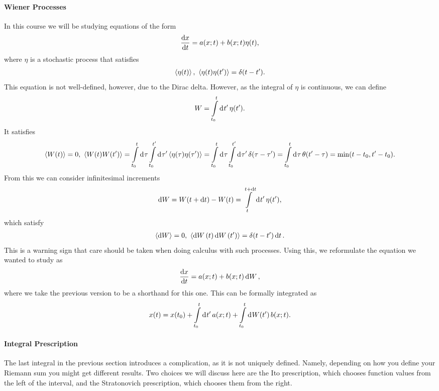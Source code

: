 \paragraph{Wiener Processes}
In this course we will be studying equations of the form
\begin{align*}
	\dv{x}{t} = a(x; t) + b(x; t)\eta(t),
\end{align*}
where $\eta$ is a stochastic process that satisfies
\begin{align*}
	\expval{\eta(t)},\ \expval{\eta(t)\eta(t\ensuremath{^{\prime}})} = \delta(t - t^{\prime}).
\end{align*}
This equation is not well-defined, however, due to the Dirac delta. However, as the integral of $\eta$ is continuous, we can define
\begin{align*}
	W = \int\limits_{t_{0}}^{t}\dd[]{t\ensuremath{^{\prime}}}\eta(t^{\prime}).
\end{align*}
It satisfies
\begin{align*}
	\expval{W(t)} = 0,\ \expval{W(t)W(t\ensuremath{^{\prime}})} = \int\limits_{t_{0}}^{t}\dd[]{\tau}\int\limits_{t_{0}}^{t^{\prime}}\dd[]{\tau\ensuremath{^{\prime}}}\expval{\eta(\tau)\eta(\tau\ensuremath{^{\prime}})} = \int\limits_{t_{0}}^{t}\dd[]{\tau}\int\limits_{t_{0}}^{t^{\prime}}\dd[]{\tau\ensuremath{^{\prime}}}\delta(\tau - \tau^{\prime}) = \int\limits_{t_{0}}^{t}\dd[]{\tau}\theta(t^{\prime} - \tau) = \min(t - t_{0}, t^{\prime} - t_{0}).
\end{align*}
From this we can consider infinitesimal increments
\begin{align*}
	\dd{W} = W(t + \dd{t}) - W(t) = \int\limits_{t}^{t + \dd{t}}\dd[]{t\ensuremath{^{\prime}}}\eta(t^{\prime}),
\end{align*}
which satisfy
\begin{align*}
	\expval{\dd{W}} = 0,\ \expval{\dd{W}(t)\dd{W}(t\ensuremath{^{\prime}})} = \delta(t - t^{\prime})\dd{t}.
\end{align*}
This is a warning sign that care should be taken when doing calculus with such processes. Using this, we reformulate the equation we wanted to study as
\begin{align*}
	\dv{x}{t} = a(x; t) + b(x; t)\dd{W},
\end{align*}
where we take the previous version to be a shorthand for this one. This can be formally integrated as
\begin{align*}
	x(t) = x(t_{0}) + \int\limits_{t_{0}}^{t}\dd[]{t\ensuremath{^{\prime}}}a(x; t) + \int\limits_{t_{0}}^{t}\dd[]{W(t\ensuremath{^{\prime}})}b(x; t).
\end{align*}

\paragraph{Integral Prescription}
The last integral in the previous section introduces a complication, as it is not uniquely defined. Namely, depending on how you define your Riemann sum you might get different results. Two choices we will discuss here are the Ito prescription, which chooses function values from the left of the interval, and the Stratonovich prescription, which chooses them from the right.

